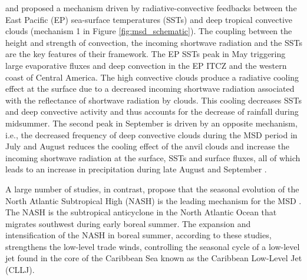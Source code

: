 \cite{magana1999} and \cite{magana2005} proposed a mechanism driven by radiative-convective feedbacks between the East Pacific (EP) sea-surface temperatures (SSTs) and deep tropical convective clouds (mechanism 1 in Figure \ref{fig:msd_schematic}). The coupling between the height and strength of convection, the incoming shortwave radiation and the SSTs are the key features of their framework. %
The EP SSTs peak in May triggering large evaporative fluxes and deep convection in the EP ITCZ and the western coast of Central America.
The high convective clouds produce a radiative cooling effect at the surface due to a decreased incoming shortwave radiation associated with the reflectance of shortwave radiation by clouds.
This cooling  decreases SSTs and deep convective activity and thus accounts for the decrease of rainfall during midsummer.
The second peak in September is driven by an opposite mechanism, i.e., the decreased frequency of deep convective clouds during the MSD period in July and August reduces the cooling effect of the anvil clouds and increase the incoming shortwave radiation at the surface, SSTs and surface fluxes, all of which leads to an increase in precipitation during late August and September \citep{magana1999}.


A large number of studies, in contrast, propose that the seasonal evolution of the North Atlantic Subtropical High (NASH) is the leading mechanism for the MSD \citep[e.g.][]{mapes2005,small2007,gamble2008,curtis2008,munoz2008,martinez2019,corrales2020}. The NASH is the subtropical anticyclone in the North Atlantic Ocean that migrates southwest during early boreal summer. The expansion and intensification of the NASH in boreal summer, according to these studies, strengthens the low-level trade winds, controlling the seasonal cycle of a low-level jet found in the core of the Caribbean Sea known as the Caribbean Low-Level Jet (CLLJ). 

